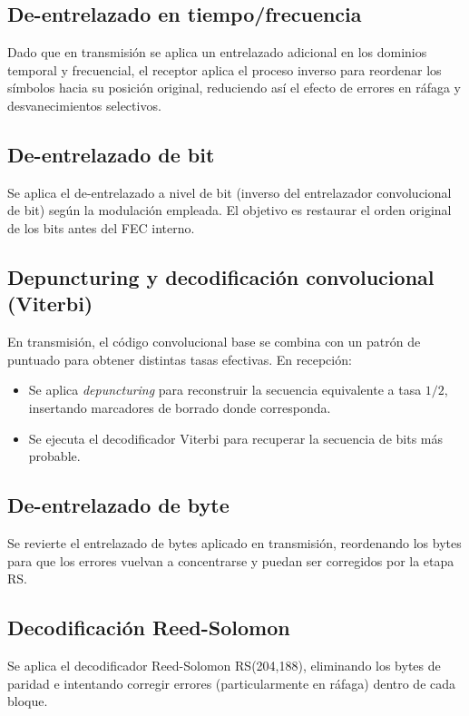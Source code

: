 \subsection{De-entrelazado en tiempo/frecuencia}
Dado que en transmisión se aplica un entrelazado adicional en los dominios temporal y
frecuencial, el receptor aplica el proceso inverso para reordenar los símbolos hacia su
posición original, reduciendo así el efecto de errores en ráfaga y desvanecimientos selectivos.

\subsection{De-entrelazado de bit}
Se aplica el de-entrelazado a nivel de bit (inverso del entrelazador convolucional de bit)
según la modulación empleada. El objetivo es restaurar el orden original de los bits antes
del FEC interno.

\subsection{Depuncturing y decodificación convolucional (Viterbi)}
En transmisión, el código convolucional base se combina con un patrón de puntuado para
obtener distintas tasas efectivas. En recepción:
\begin{itemize}
	\item Se aplica \textit{depuncturing} para reconstruir la secuencia equivalente a tasa $1/2$,
	insertando marcadores de borrado donde corresponda.
	\item Se ejecuta el decodificador Viterbi para recuperar la secuencia de bits más probable.
\end{itemize}

\subsection{De-entrelazado de byte}
Se revierte el entrelazado de bytes aplicado en transmisión, reordenando los bytes para
que los errores vuelvan a concentrarse y puedan ser corregidos por la etapa RS.

\subsection{Decodificación Reed-Solomon}
Se aplica el decodificador Reed-Solomon RS(204,188), eliminando los bytes de paridad e
intentando corregir errores (particularmente en ráfaga) dentro de cada bloque.

